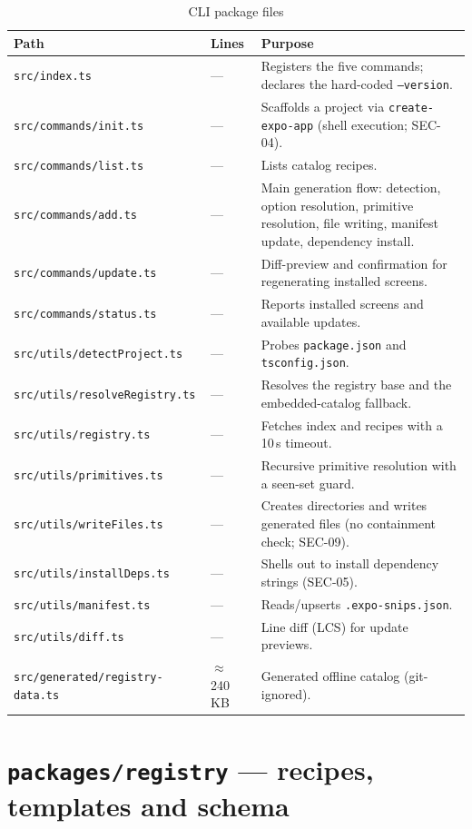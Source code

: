 \begin{longtable}{p{6cm}p{2.2cm}p{6.2cm}}
\caption{CLI package files}\\
\toprule
\textbf{Path} & \textbf{Lines} & \textbf{Purpose} \\
\midrule

\texttt{src/index.ts} & --- & Registers the five commands; declares the
hard-coded \texttt{--version}. \\
\texttt{src/commands/init.ts} & --- & Scaffolds a project via
\texttt{create-expo-app} (shell execution; SEC-04). \\
\texttt{src/commands/list.ts} & --- & Lists catalog recipes. \\
\texttt{src/commands/add.ts} & --- & Main generation flow: detection, option
resolution, primitive resolution, file writing, manifest update, dependency
install. \\
\texttt{src/commands/update.ts} & --- & Diff-preview and confirmation for
regenerating installed screens. \\
\texttt{src/commands/status.ts} & --- & Reports installed screens and available
updates. \\
\texttt{src/utils/detectProject.ts} & --- & Probes \texttt{package.json} and
\texttt{tsconfig.json}. \\
\texttt{src/utils/resolveRegistry.ts} & --- & Resolves the registry base and the
embedded-catalog fallback. \\
\texttt{src/utils/registry.ts} & --- & Fetches index and recipes with a 10\,s
timeout. \\
\texttt{src/utils/primitives.ts} & --- & Recursive primitive resolution with a
seen-set guard. \\
\texttt{src/utils/writeFiles.ts} & --- & Creates directories and writes generated
files (no containment check; SEC-09). \\
\texttt{src/utils/installDeps.ts} & --- & Shells out to install dependency strings
(SEC-05). \\
\texttt{src/utils/manifest.ts} & --- & Reads/upserts \texttt{.expo-snips.json}. \\
\texttt{src/utils/diff.ts} & --- & Line diff (LCS) for update previews. \\
\texttt{src/generated/registry-data.ts} & $\approx$240\,KB & Generated offline
catalog (git-ignored). \\
\bottomrule
\end{longtable}

\section{\texttt{packages/registry} --- recipes, templates and schema}

